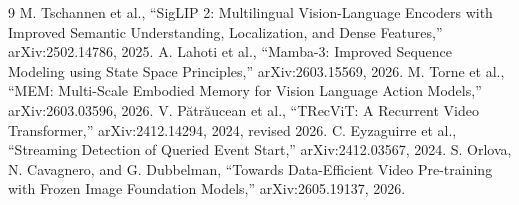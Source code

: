 \documentclass[letterpaper,10pt,conference]{ieeeconf}
\begin{document}
\begin{thebibliography}{9}
 M. Tschannen et al., ``SigLIP 2: Multilingual
Vision-Language Encoders with Improved Semantic Understanding,
Localization, and Dense Features,'' arXiv:2502.14786, 2025.
 A. Lahoti et al., ``Mamba-3: Improved Sequence Modeling
using State Space Principles,'' arXiv:2603.15569, 2026.
 M. Torne et al., ``MEM: Multi-Scale Embodied Memory for
Vision Language Action Models,'' arXiv:2603.03596, 2026.
 V. P\u{a}tr\u{a}ucean et al., ``TRecViT: A Recurrent
Video Transformer,'' arXiv:2412.14294, 2024, revised 2026.
 C. Eyzaguirre et al., ``Streaming Detection of Queried
Event Start,'' arXiv:2412.03567, 2024.
 S. Orlova, N. Cavagnero, and G. Dubbelman,
``Towards Data-Efficient Video Pre-training with Frozen Image Foundation
Models,'' arXiv:2605.19137, 2026.
\end{thebibliography}
\end{document}
